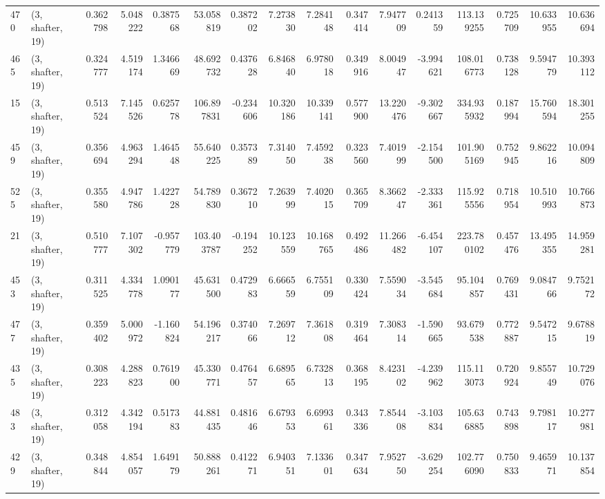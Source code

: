 \begin{tabular}{llrrrrrrrrrrrrrr}
470 &  (3, shafter, 19) &   0.362798 &   5.048222 &   0.387568 &    53.058819 &   0.387202 &   7.273830 &   7.284148 &  0.347414 &   7.947709 &   0.241359 &    113.139255 &   0.725709 &   10.633955 &   10.636694 \\
465 &  (3, shafter, 19) &   0.324777 &   4.519174 &   1.346669 &    48.692732 &   0.437628 &   6.846840 &   6.978018 &  0.349916 &   8.004947 &  -3.994621 &    108.016773 &   0.738128 &    9.594779 &   10.393112 \\
15  &  (3, shafter, 19) &   0.513524 &   7.145526 &   0.625778 &   106.897831 &  -0.234606 &  10.320186 &  10.339141 &  0.577900 &  13.220476 &  -9.302667 &    334.935932 &   0.187994 &   15.760594 &   18.301255 \\
459 &  (3, shafter, 19) &   0.356694 &   4.963294 &   1.464548 &    55.640225 &   0.357389 &   7.314050 &   7.459238 &  0.323560 &   7.401999 &  -2.154500 &    101.905169 &   0.752945 &    9.862216 &   10.094809 \\
525 &  (3, shafter, 19) &   0.355580 &   4.947786 &   1.422728 &    54.789830 &   0.367210 &   7.263999 &   7.402015 &  0.365709 &   8.366247 &  -2.333361 &    115.925556 &   0.718954 &   10.510993 &   10.766873 \\
21  &  (3, shafter, 19) &   0.510777 &   7.107302 &  -0.957779 &   103.403787 &  -0.194252 &  10.123559 &  10.168765 &  0.492486 &  11.266482 &  -6.454107 &    223.780102 &   0.457476 &   13.495355 &   14.959281 \\
453 &  (3, shafter, 19) &   0.311525 &   4.334778 &   1.090177 &    45.631500 &   0.472983 &   6.666559 &   6.755109 &  0.330424 &   7.559034 &  -3.545684 &     95.104857 &   0.769431 &    9.084766 &    9.752172 \\
477 &  (3, shafter, 19) &   0.359402 &   5.000972 &  -1.160824 &    54.196217 &   0.374066 &   7.269712 &   7.361808 &  0.319464 &   7.308314 &  -1.590665 &     93.679538 &   0.772887 &    9.547215 &    9.678819 \\
435 &  (3, shafter, 19) &   0.308223 &   4.288823 &   0.761900 &    45.330771 &   0.476457 &   6.689565 &   6.732813 &  0.368195 &   8.423102 &  -4.239962 &    115.113073 &   0.720924 &    9.855749 &   10.729076 \\
483 &  (3, shafter, 19) &   0.312058 &   4.342194 &   0.517383 &    44.881435 &   0.481646 &   6.679353 &   6.699361 &  0.343336 &   7.854408 &  -3.103834 &    105.636885 &   0.743898 &    9.798117 &   10.277981 \\
429 &  (3, shafter, 19) &   0.348844 &   4.854057 &   1.649179 &    50.888261 &   0.412271 &   6.940351 &   7.133601 &  0.347634 &   7.952750 &  -3.629254 &    102.776090 &   0.750833 &    9.465971 &   10.137854 \\

\end{tabular}
